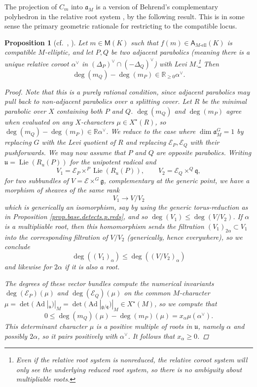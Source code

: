 \documentclass[openany]{amsbook}
\newtheorem{proposition}[theorem]{Proposition}
\theoremstyle{definition}
\theoremstyle{remark}
\numberwithin{equation}{section}
\newcommand{\R}{\mathbb{R}}
\newcommand{\cE}{\mathcal{E}}
\renewcommand{\-}{\operatorname{-}}
\renewcommand{\a}{\mathfrak{a}}
\newcommand{\on}[1]{\operatorname{#1}}
\newcommand{\el}{\text{-ell}}
\newcommand{\bM}{\mathsf{M}}
\newcommand{\bA}{\mathsf{A}}
\newcommand{\bAe}[1]{\bA_{#1\el}}
\renewcommand{\fg}{\mathfrak{g}}
\begin{document}
The projection of $C_m$ into $\a_M$ is a version of Behrend's complementary polyhedron in the relative root system \cite{behrendthesis}, by the following result. This is in some sense the primary geometric rationale for restricting to the compatible locus. 

\begin{proposition}[{{cf.\ \cite[Lemme 5.7.1]{CLI}, \cite[Lemma 3.15]{HeinlothGIT}}}] \label{prop.behrend.conds.rat}
    Let $m \in \bM(K)$ such that $f(m) \in \bAe{M}(K)$ is compatible $M$-elliptic, and let $P,Q$ be two adjacent parabolics (meaning there is a unique relative coroot $\alpha^\vee$ in $(\Delta_P)^\vee \cap (-\Delta_Q)^\vee$) with Levi $M$.\footnote{Even if the relative root system is nonreduced, the relative coroot system will only see the underlying reduced root system, so there is no ambiguity about multipliable roots.} Then
    $$
        \deg(m_Q) - \deg(m_P) \in \R_{\ge 0} \alpha^\vee.
    $$
    \begin{proof}
        Note that this is a purely rational condition, since adjacent parabolics may pull back to non-adjacent parabolics over a splitting cover. Let $R$ be the minimal parabolic over $X$ containing both $P$ and $Q$. $\deg(m_Q)$ and $\deg(m_P)$ agree when evaluated on any $X$-characters $\mu \in X^\star(R)$, so $\deg(m_Q) - \deg(m_P) \in \R \alpha^{\vee}$. We reduce to the case where $\dim \a_M^G = 1$ by replacing $G$ with the Levi quotient of $R$ and replacing $\cE_P, \cE_Q$ with their pushforwards. We may now assume that $P$ and $Q$ are opposite parabolics. Writing $\mathfrak{u} = \on{Lie}(R_u(P))$ for the unipotent radical and
        $$
            V_1 = \cE_P \times^P \on{Lie}(R_u(P)), \qquad V_2 = \cE_Q \times^Q \mathfrak{q},
        $$
        for two subbundles of $V = \cE \times^G \fg$, complementary at the generic point, we have a morphism of sheaves of the same rank
        $$
            V_1 \to V/V_2
        $$
        which is generically an isomorphism, say by using the generic torus-reduction as in Proposition \ref{prop.base.detects.p.reds}, and so $\deg(V_1) \le \deg(V/V_2)$. If $\alpha$ is a multipliable root, then this homomorphism sends the filtration $(V_1)_{2\alpha} \subset V_1$ into the corresponding filtration of $V/V_2$ (generically, hence everywhere), so we conclude
        $$
            \deg((V_1)_\alpha) \le \deg((V/V_2)_\alpha)
        $$
        and likewise for $2\alpha$ if it is also a root.
        
        The degrees of these vector bundles compute the numerical invariants $\deg(\cE_P)(\mu)$ and $\deg(\cE_Q)(\mu)$ on the common $M$-character $\mu = \det(\on{Ad}|_{\mathfrak{u}})|_M = \det(\on{Ad}|_{\fg/\mathfrak{q}})|_M \in X^\star(M)$, so we compute that 
        $$
            0 \le \deg(m_Q)(\mu) - \deg(m_P)(\mu) = x_\alpha \mu(\alpha^\vee).
        $$
        This determinant character $\mu$ is a positive multiple of roots in $\mathfrak{u}$, namely $\alpha$ and possibly $2 \alpha$, so it pairs positively with $\alpha^\vee$. It follows that $x_\alpha \ge 0$. 
    \end{proof}
\end{proposition}
\end{document}

